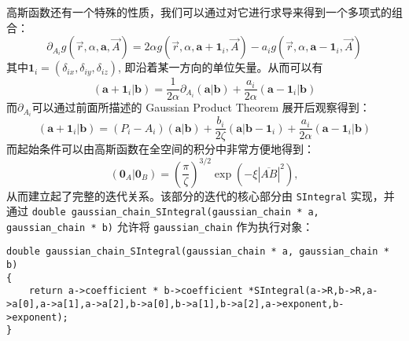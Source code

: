 \documentclass[12pt,a4paper,openany,twoside]{article}
\numberwithin{equation}{section}
\begin{document}
                高斯函数还有一个特殊的性质，我们可以通过对它进行求导来得到一个多项式的组合：
                \begin{equation}
                    \partial_{A_i} g(\vec{r},\alpha,\boldsymbol{a},\vec{A}) = 2 \alpha g(\vec{r},\alpha,\boldsymbol{a} + \boldsymbol{1}_i,\vec{A}) - a_i g(\vec{r},\alpha,\boldsymbol{a} - \boldsymbol{1}_i,\vec{A})
                \end{equation}
                其中$\boldsymbol{1}_i = (\delta_{ix},\delta_{iy},\delta_{iz})$, 即沿着某一方向的单位矢量。从而可以有
                \begin{equation}
                    (\boldsymbol{a}+\boldsymbol{1}_i|\boldsymbol{b}) = \frac{1}{2\alpha} \partial_{A_i} (\boldsymbol{a}|\boldsymbol{b}) + \frac{a_i}{2\alpha} (\boldsymbol{a}-\boldsymbol{1}_i|\boldsymbol{b})
                \end{equation}
                而$\partial_{A_i}$可以通过前面所描述的 Gaussian Product Theorem 展开后观察得到：
                \begin{equation}
                    (\boldsymbol{a}+\boldsymbol{1}_i|\boldsymbol{b}) = (P_i - A_i)(\boldsymbol{a}|\boldsymbol{b}) +  \frac{b_i}{2\zeta} (\boldsymbol{a}|\boldsymbol{b}-\boldsymbol{1}_i) + \frac{a_i}{2\alpha} (\boldsymbol{a}-\boldsymbol{1}_i|\boldsymbol{b})
                \end{equation}
                而起始条件可以由高斯函数在全空间的积分中非常方便地得到：
                \begin{equation}
                    (\boldsymbol{0}_A|\boldsymbol{0}_B) = \left(\frac{\pi}{\zeta}\right)^{3/2} \exp(- \xi |\overline{AB}|^2),
                \end{equation}
                从而建立起了完整的迭代关系。该部分的迭代的核心部分由 \lstinline$SIntegral$ 实现，并通过 \lstinline$double gaussian_chain_SIntegral(gaussian_chain * a, gaussian_chain * b)$ 允许将 \lstinline$gaussian_chain$ 作为执行对象：
                \begin{lstlisting}
double gaussian_chain_SIntegral(gaussian_chain * a, gaussian_chain * b)
{
    return a->coefficient * b->coefficient *SIntegral(a->R,b->R,a->a[0],a->a[1],a->a[2],b->a[0],b->a[1],b->a[2],a->exponent,b->exponent);
}
                \end{lstlisting}
                
\end{document}
